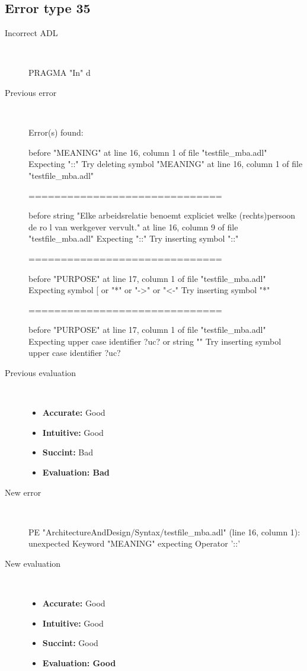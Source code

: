 \hrulefill

\subsection{Error type 35}
  \begin{description}
  \item[Incorrect ADL]~\\
\begin{adl}
PRAGMA "In" d\end{adl}
  \item[Previous error]~\\
\begin{haskell}
Error(s) found:

before "MEANING" at line 16, column 1 of file "testfile_mba.adl"
Expecting "::"
Try deleting symbol "MEANING" at line 16, column 1 of file "testfile_mba.adl"

==============================

before string "Elke arbeidsrelatie benoemt expliciet welke (rechts)persoon de ro
l van werkgever vervult." at line 16, column 9 of file "testfile_mba.adl"
Expecting "::"
Try inserting symbol "::"

==============================

before "PURPOSE" at line 17, column 1 of file "testfile_mba.adl"
Expecting symbol [ or "*" or "->" or "<-"
Try inserting symbol "*"

==============================

before "PURPOSE" at line 17, column 1 of file "testfile_mba.adl"
Expecting upper case identifier ?uc? or string ""
Try inserting symbol upper case identifier ?uc?\end{haskell}
  \item[Previous evaluation]~\\
    \begin{itemize}
    \item \textbf{Accurate:} Good
    \item \textbf{Intuitive:} Good
    \item \textbf{Succint:} Bad
    \item \textbf{Evaluation: Bad}
    \end{itemize}
  \item[New error]~\\
\begin{haskell}
PE "ArchitectureAndDesign/Syntax/testfile_mba.adl" (line 16, column 1):
unexpected Keyword "MEANING"
expecting Operator '::'
\end{haskell}
  \item[New evaluation]~\\
    \begin{itemize}
    \item \textbf{Accurate:} Good
    \item \textbf{Intuitive:} Good
    \item \textbf{Succint:} Good
    \item \textbf{Evaluation: Good
}
    \end{itemize}
  \end{description}

